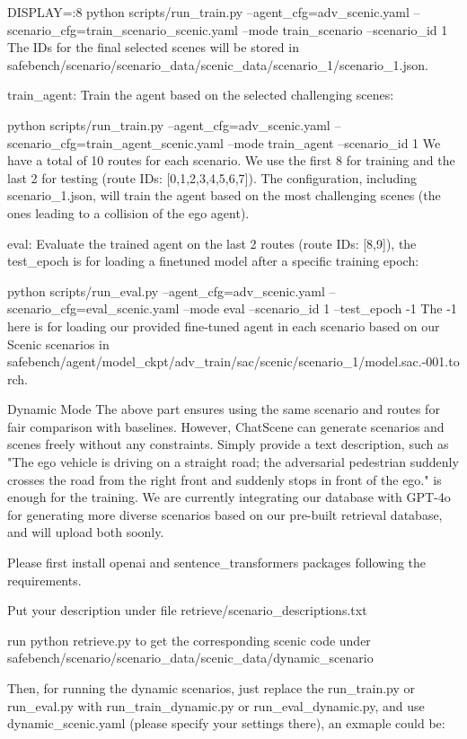 \begin{appendix}
DISPLAY=:8 python scripts/run\_train.py --agent\_cfg=adv\_scenic.yaml --scenario\_cfg=train\_scenario\_scenic.yaml --mode train\_scenario --scenario\_id 1
The IDs for the final selected scenes will be stored in safebench/scenario/scenario\_data/scenic\_data/scenario\_1/scenario\_1.json.

train\_agent: Train the agent based on the selected challenging scenes:

python scripts/run\_train.py --agent\_cfg=adv\_scenic.yaml --scenario\_cfg=train\_agent\_scenic.yaml --mode train\_agent --scenario\_id 1
We have a total of 10 routes for each scenario. We use the first 8 for training and the last 2 for testing (route IDs: [0,1,2,3,4,5,6,7]). The configuration, including scenario\_1.json, will train the agent based on the most challenging scenes (the ones leading to a collision of the ego agent).

eval: Evaluate the trained agent on the last 2 routes (route IDs: [8,9]), the test\_epoch is for loading a finetuned model after a specific training epoch:

python scripts/run\_eval.py --agent\_cfg=adv\_scenic.yaml --scenario\_cfg=eval\_scenic.yaml --mode eval --scenario\_id 1 --test\_epoch -1
The -1 here is for loading our provided fine-tuned agent in each scenario based on our Scenic scenarios in safebench/agent/model\_ckpt/adv\_train/sac/scenic/scenario\_1/model.sac.-001.torch.

Dynamic Mode
The above part ensures using the same scenario and routes for fair comparison with baselines. However, ChatScene can generate scenarios and scenes freely without any constraints. Simply provide a text description, such as "The ego vehicle is driving on a straight road; the adversarial pedestrian suddenly crosses the road from the right front and suddenly stops in front of the ego." is enough for the training. We are currently integrating our database with GPT-4o for generating more diverse scenarios based on our pre-built retrieval database, and will upload both soonly.

Please first install openai and sentence\_transformers packages following the requirements.

Put your description under file retrieve/scenario\_descriptions.txt

run python retrieve.py to get the corresponding scenic code under safebench/scenario/scenario\_data/scenic\_data/dynamic\_scenario

Then, for running the dynamic scenarios, just replace the run\_train.py or run\_eval.py with run\_train\_dynamic.py or run\_eval\_dynamic.py, and use dynamic\_scenic.yaml (please specify your settings there), an exmaple could be:


\end{appendix}

